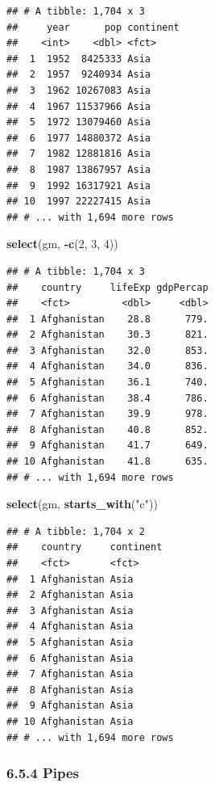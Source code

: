 \documentclass[]{article}
\newenvironment{Shaded}{\begin{snugshade}}{\end{snugshade}}
\newcommand{\KeywordTok}[1]{\textcolor[rgb]{0.13,0.29,0.53}{\textbf{#1}}}
\newcommand{\DecValTok}[1]{\textcolor[rgb]{0.00,0.00,0.81}{#1}}
\newcommand{\StringTok}[1]{\textcolor[rgb]{0.31,0.60,0.02}{#1}}
\newcommand{\OperatorTok}[1]{\textcolor[rgb]{0.81,0.36,0.00}{\textbf{#1}}}
\newcommand{\NormalTok}[1]{#1}
\begin{document}
\begin{verbatim}
## # A tibble: 1,704 x 3
##     year      pop continent
##    <int>    <dbl> <fct>    
##  1  1952  8425333 Asia     
##  2  1957  9240934 Asia     
##  3  1962 10267083 Asia     
##  4  1967 11537966 Asia     
##  5  1972 13079460 Asia     
##  6  1977 14880372 Asia     
##  7  1982 12881816 Asia     
##  8  1987 13867957 Asia     
##  9  1992 16317921 Asia     
## 10  1997 22227415 Asia     
## # ... with 1,694 more rows
\end{verbatim}

\begin{Shaded}
\begin{Highlighting}[]
\KeywordTok{select}\NormalTok{(gm, }\OperatorTok{-}\KeywordTok{c}\NormalTok{(}\DecValTok{2}\NormalTok{, }\DecValTok{3}\NormalTok{, }\DecValTok{4}\NormalTok{))}
\end{Highlighting}
\end{Shaded}

\begin{verbatim}
## # A tibble: 1,704 x 3
##    country     lifeExp gdpPercap
##    <fct>         <dbl>     <dbl>
##  1 Afghanistan    28.8      779.
##  2 Afghanistan    30.3      821.
##  3 Afghanistan    32.0      853.
##  4 Afghanistan    34.0      836.
##  5 Afghanistan    36.1      740.
##  6 Afghanistan    38.4      786.
##  7 Afghanistan    39.9      978.
##  8 Afghanistan    40.8      852.
##  9 Afghanistan    41.7      649.
## 10 Afghanistan    41.8      635.
## # ... with 1,694 more rows
\end{verbatim}

\begin{Shaded}
\begin{Highlighting}[]
\KeywordTok{select}\NormalTok{(gm, }\KeywordTok{starts_with}\NormalTok{(}\StringTok{"c"}\NormalTok{))}
\end{Highlighting}
\end{Shaded}

\begin{verbatim}
## # A tibble: 1,704 x 2
##    country     continent
##    <fct>       <fct>    
##  1 Afghanistan Asia     
##  2 Afghanistan Asia     
##  3 Afghanistan Asia     
##  4 Afghanistan Asia     
##  5 Afghanistan Asia     
##  6 Afghanistan Asia     
##  7 Afghanistan Asia     
##  8 Afghanistan Asia     
##  9 Afghanistan Asia     
## 10 Afghanistan Asia     
## # ... with 1,694 more rows
\end{verbatim}

\subsubsection{6.5.4 Pipes}\label{pipes}
\end{document}
